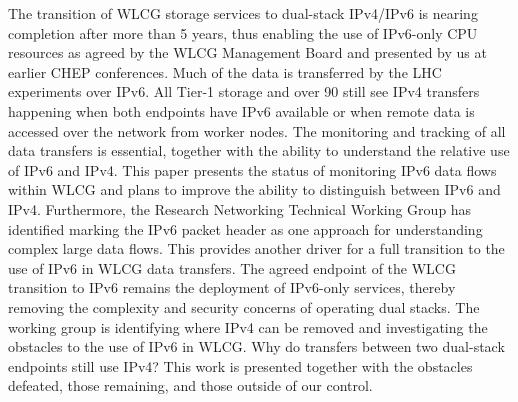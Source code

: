 \documentclass{webofc}
\begin{document}
\abstract
{The transition of WLCG storage services to dual-stack IPv4/IPv6 is nearing completion after more
than 5 years, thus enabling the use of IPv6-only CPU resources as agreed by the WLCG Management
Board and presented by us at earlier CHEP conferences. Much of the data is transferred by the LHC
experiments over IPv6. All Tier-1 storage and over 90%
still see IPv4 transfers happening when both endpoints have IPv6 available or when remote data is
accessed over the network from worker nodes.
The monitoring and tracking of all data transfers is essential, together with the ability to understand
the relative use of IPv6 and IPv4. This paper presents the status of monitoring IPv6 data flows within
WLCG and plans to improve the ability to distinguish between IPv6 and IPv4. Furthermore, the
Research Networking Technical Working Group has identified marking the IPv6 packet header as one
approach for understanding complex large data flows. This provides another driver for a full
transition to the use of IPv6 in WLCG data transfers.
The agreed endpoint of the WLCG transition to IPv6 remains the deployment of IPv6-only services,
thereby removing the complexity and security concerns of operating dual stacks. The working group
is identifying where IPv4 can be removed and investigating the obstacles to the use of IPv6 in WLCG.
Why do transfers between two dual-stack endpoints still use IPv4? This work is presented together
with the obstacles defeated, those remaining, and those outside of our control.}
\maketitle
\end{document}
